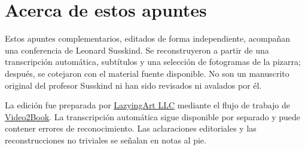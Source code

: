 \documentclass[11pt,oneside]{book}
\begin{document}
\frontmatter
\hypersetup{pageanchor=false}

\hypersetup{pageanchor=true}

\clearpage
\chapter*{Acerca de estos apuntes}
Estos apuntes complementarios, editados de forma independiente, acompañan una conferencia de Leonard
Susskind. Se reconstruyeron a partir de una transcripción automática, subtítulos
y una selección de fotogramas de la pizarra; después, se cotejaron con el material
fuente disponible. No son un manuscrito original del profesor Susskind ni
han sido revisados ni avalados por él.

La edición fue preparada por \href{https://lazying.art}{LazyingArt LLC}
mediante el flujo de trabajo de
\href{https://github.com/lachlanchen/Video2Book}{Video2Book}.
La transcripción automática sigue disponible por separado y puede contener
errores de reconocimiento. Las aclaraciones editoriales y las reconstrucciones
no triviales se señalan en notas al pie.
\clearpage
\tableofcontents
\mainmatter
\graphicspath{{../../../generated_course_notes/supplementary/higgs_boson/2012_summer/chapters/lecture_01/}{../../../generated_course_notes/supplementary/higgs_boson/2012_summer/figures/}{../../../generated_course_notes/supplementary/higgs_boson/2012_summer/assets/}}

\end{document}

